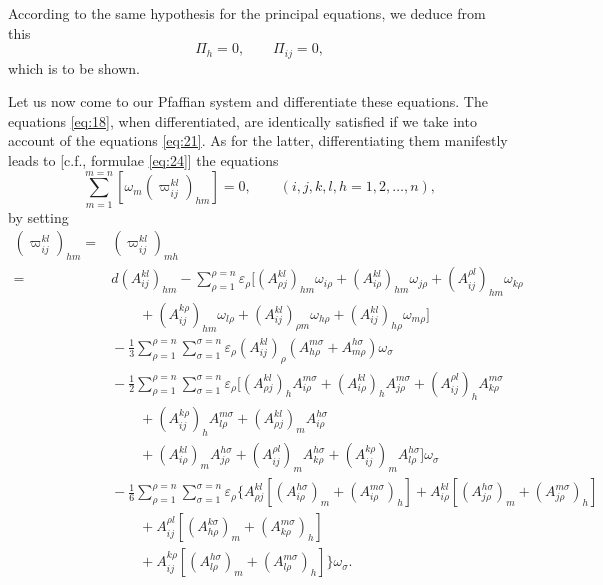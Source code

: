 \documentclass[leqno,12pt]{article}
\makeatletter
\let\old@epsilon\epsilon
\let\old@varepsilon\varepsilon
\let\epsilon\old@varepsilon
\let\varepsilon\old@epsilon
\theoremstyle{shape1}
\theoremstyle{shape0}
\theoremstyle{shape2}
\theoremstyle{definition}
\makeatother
\begin{document}
According to the same hypothesis for the principal equations, we deduce from this
\[
\Pi_{h}=0,\qquad \Pi_{ij}=0,
\]
which is to be shown.

Let us now come to our Pfaffian system and differentiate these equations. The equations \eqref{eq:18}, when differentiated, are identically satisfied if we take into account of the equations \eqref{eq:21}. As for the latter, differentiating them manifestly leads to [c.f., formulae \eqref{eq:24}] the equations
\begin{equation}
  \label{eq:31}
  \sum_{m=1}^{m=n}[\omega_{m}(\varpi^{kl}_{ij})_{hm}]=0,\qquad(i,j,k,l,h=1,2,\dots,n),
\end{equation}
by setting
\begin{align*}
  (\varpi^{kl}_{ij})_{hm}=&{}(\varpi^{kl}_{ij})_{mh}\\
  =&{}d(A^{kl}_{ij})_{hm}-\sum_{\rho=1}^{\rho=n}\epsilon_{\rho}[(A^{kl}_{\rho j})_{hm}\omega_{i\rho}+(A^{kl}_{i\rho})_{hm}\omega_{j\rho}+(A^{\rho l}_{ij})_{hm}\omega_{k\rho}\\
  &{}\qquad + (A^{k\rho}_{ij})_{hm}\omega_{l\rho}+(A^{kl}_{ij})_{\rho m}\omega_{h\rho}+(A^{kl}_{ij})_{h\rho}\omega_{m\rho}]\\
  &{}-\frac{1}{3}\sum_{\rho=1}^{\rho=n}\sum_{\sigma=1}^{\sigma=n}\epsilon_{\rho}(A^{kl}_{ij})_{\rho}(A^{m\sigma}_{h\rho}+A^{h\sigma}_{m\rho})\omega_{\sigma}\\
  &{}-\frac{1}{2}\sum_{\rho=1}^{\rho=n}\sum_{\sigma=1}^{\sigma=n}\epsilon_{\rho}[(A^{kl}_{\rho j})_{h}A^{m\sigma}_{i\rho}+(A^{kl}_{i\rho})_{h}A^{m\sigma}_{j\rho}+(A^{\rho l}_{ij})_{h}A^{m\sigma}_{k\rho}\\
  &{}\qquad + (A^{k\rho}_{ij})_{h}A^{m\sigma}_{l\rho}+(A^{kl}_{\rho j})_{m}A^{h\sigma}_{i\rho}\\
  &{}\qquad + (A^{kl}_{i\rho})_{m}A^{h\sigma}_{j\rho}+(A^{\rho l}_{ij})_{m}A^{h\sigma}_{k\rho}+(A^{k\rho}_{ij})_{m}A^{h\sigma}_{l\rho}]\omega_{\sigma}\\
  &{}-\frac{1}{6}\sum_{\rho=1}^{\rho=n}\sum_{\sigma=1}^{\sigma=n}\epsilon_{\rho}\{A^{kl}_{\rho j}[(A^{h\sigma}_{i\rho})_{m}+(A^{m\sigma}_{i\rho})_{h}]+A^{kl}_{i\rho}[(A^{h\sigma}_{j\rho})_{m}+(A^{m\sigma}_{j\rho})_{h}]\\
  &{}\qquad + A^{\rho l}_{ij}[(A^{k\sigma}_{h\rho})_{m}+(A^{m\sigma}_{k\rho})_{h}]\\
  &{}\qquad + A^{k\rho}_{ij}[(A^{h\sigma}_{l\rho})_{m}+(A^{m\sigma}_{l\rho})_{h}]\}\omega_{\sigma}.
\end{align*}
\end{document}
